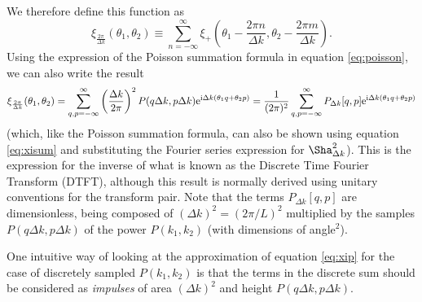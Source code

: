 \documentclass[preprint]{aastex}
\newcommand{\mi}{{\rm i}}
\newcommand{\me}{{\rm e}}
\begin{document}
We therefore define this function as
\begin{equation}
\xi_{\frac{2\pi}{\Delta k}}(\theta_1, \theta_2) \equiv \sum_{n = -\infty}^{\infty} \xi_+\left(\theta_1
- \frac{2 \pi n}{\Delta k},  \theta_2
- \frac{2 \pi m}{\Delta k} \right).
\end{equation}
Using the expression of the Poisson summation formula in equation
\eqref{eq:poisson}, we can also write the result
\begin{equation}
\xi_{\frac{2\pi}{\Delta k}}(\theta_1, \theta_2) =
\sum_{q,p=-\infty}^{\infty} \left( \frac{\Delta k}{2 \pi} \right)^2 P(q \Delta k, p \Delta k) \me^{\mi \Delta
  k (\theta_1 q + \theta_2 p)} = \frac{1}{( 2 \pi)^2}
\sum_{q,p=-\infty}^{\infty} P_{\Delta k} [q, p] \me^{\mi \Delta
  k (\theta_1 q + \theta_2 p)} \label{eq:dtft} 
\end{equation}
(which, like the Poisson summation formula, can also be shown using
equation \eqref{eq:xisum} and substituting the Fourier series expression
for $\Sha^2_{\Delta k}$).  This is the expression for the inverse of
what is known as the Discrete Time Fourier Transform (DTFT), although
this result is normally derived using unitary conventions for the
transform pair.  Note that the terms $P_{\Delta k}[q, p]$ are
dimensionless, being composed of $(\Delta k)^2 = (2 \pi / L)^2$
multiplied by the samples $P(q \Delta k, p \Delta k)$ of the power
$P(k_1, k_2)$ (with dimensions of angle$^2$).

One intuitive way of looking at the approximation of equation \eqref{eq:xip} for the case of discretely
sampled $P(k_1, k_2)$ is that the terms in the discrete sum should be
considered as \emph{impulses} of area $(\Delta k)^2$ and height $P(q \Delta k, p \Delta k)$.
\end{document}
